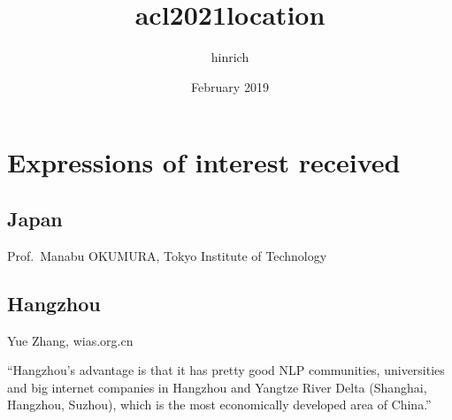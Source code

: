 \documentclass{article}
\title{acl2021location}
\author{hinrich }
\date{February 2019}
\begin{document}
\maketitle

\section{Expressions of interest received}
\subsection{Japan}
Prof.\ Manabu OKUMURA, Tokyo Institute of Technology 
\subsection{Hangzhou}
Yue Zhang, wias.org.cn

``Hangzhou’s
advantage is that it has pretty good NLP communities, universities and big internet companies in
Hangzhou and Yangtze River Delta (Shanghai, Hangzhou, Suzhou), which is the most economically
developed area of China.''
\end{document}
